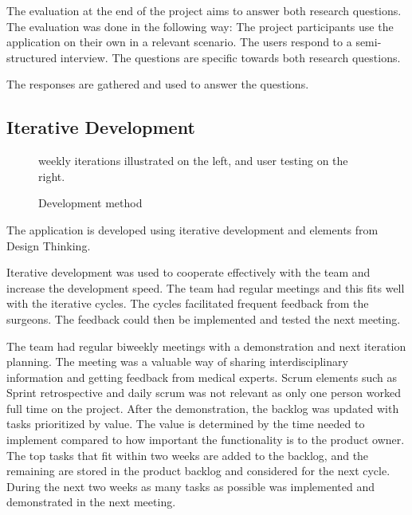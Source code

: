 \documentclass[a4paper]{report}
\begin{document}
The evaluation at the end of the project aims to answer both research questions. The evaluation was done in the following way:
The project participants use the application on their own in a relevant scenario.
The users respond to a semi-structured interview. The questions are specific towards both research questions.

The responses are gathered and used to answer the questions.

\subsection{Iterative Development}

\begin{figure}[h!]
    \centering
	\hfill
  \caption{Development method}
  \small
  weekly iterations illustrated on the left, and user testing on the right.
\end{figure}

The application is developed using iterative development and elements from Design Thinking.

Iterative development was used to cooperate effectively with the team and increase the development speed. The team had regular meetings and this fits well with the iterative cycles. The cycles facilitated frequent feedback from the surgeons. The feedback could then be implemented and tested the next meeting.

The team had regular biweekly meetings with a demonstration and next iteration planning. The meeting was a valuable way of sharing interdisciplinary information and getting feedback from medical experts. Scrum elements such as Sprint retrospective and daily scrum was not relevant as only one person worked full time on the project.
After the demonstration, the backlog was updated with tasks prioritized by value. The value is determined by the time needed to implement compared to how important the functionality is to the product owner. The top tasks that fit within two weeks are added to the backlog, and the remaining are stored in the product backlog and considered for the next cycle.
During the next two weeks as many tasks as possible was implemented and demonstrated in the next meeting.
\end{document}
